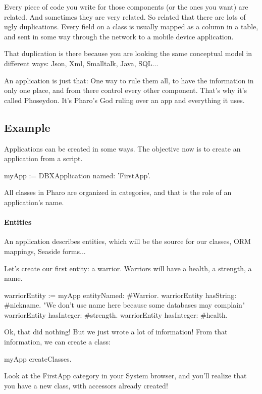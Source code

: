 \documentclass[a4paper,10pt,twoside]{book}
\begin{document}
Every piece of code you write for those components (or the ones you want) are related. And sometimes they are very related. So related that there are lots of ugly duplications. Every field on a class is usually mapped as a column in a table, and sent in some way through the network to a mobile device application.

That duplication is there because you are looking the same conceptual model in different ways: Json, Xml, Smalltalk, Java, SQL...

An application is just that: One way to rule them all, to have the information in only one place, and from there control every other component. That's why it's called Phoseydon. It's Pharo's God ruling over an app and everything it uses.

\subsection{Example}

Applications can be created in some ways. The objective now is to create an application from a script.
\begin{code}{}
 myApp := DBXApplication named: 'FirstApp'.
\end{code} 
 
All classes in Pharo are organized in categories, and that is the role of an application's name.

\paragraph{Entities}

An application describes entities, which will be the source for our classes, ORM mappings, Seaside forms...

Let's create our first entity: a warrior. Warriors will have a health, a strength, a name.

\begin{code}{}
warriorEntity := myApp entityNamed: #Warrior.
warriorEntity hasString: #nickname. "We don't use name here because some databases may complain"
warriorEntity hasInteger: #strength.
warriorEntity hasInteger: #health.
\end{code}

Ok, that did nothing! But we just wrote a lot of information! From that information, we can create a class:

\begin{code}
myApp createClasses.
\end{code}
Look at the FirstApp category in your System browser, and you'll realize that you have a new class, with accessors already created!
\end{document}
